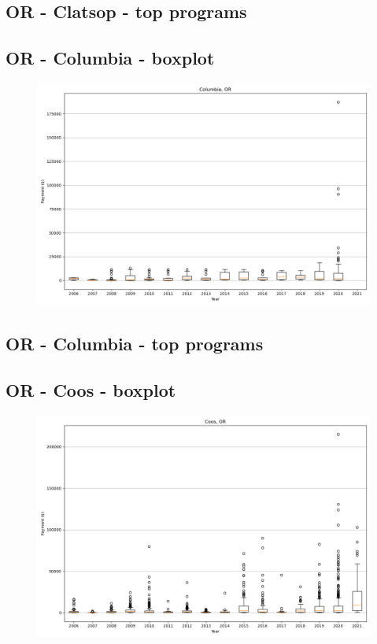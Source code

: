 \subsection*{OR - Clatsop - top programs}

\newpage
\subsection*{OR - Columbia - boxplot}
\begin{figure}[h]
\centering
\includegraphics[width=7in]{../output/boxplots/counties/Columbia-OR_boxplot.png}
\end{figure}


\subsection*{OR - Columbia - top programs}

\newpage
\subsection*{OR - Coos - boxplot}
\begin{figure}[h]
\centering
\includegraphics[width=7in]{../output/boxplots/counties/Coos-OR_boxplot.png}
\end{figure}


